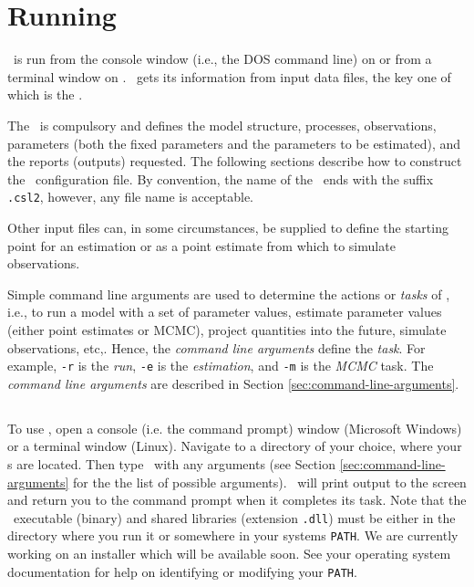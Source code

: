 \section{Running \CNAME\label{sec:running-sam}}

\CNAME\ is run from the console window (i.e., the DOS command line) on  or from a terminal window on . \CNAME\ gets its information from input data files, the key one of which is the \config{}. 

The \config\ is compulsory and defines the model structure, processes, observations, parameters (both the fixed parameters and the parameters to be estimated), and the reports (outputs) requested. The following sections  describe how to construct the \CNAME\ configuration file. By convention, the name of the \config\ ends with the suffix \texttt{.csl2}, however, any file name is acceptable.

Other input files can, in some circumstances, be supplied to define the starting point for an estimation or as a point estimate from which to simulate observations.

Simple command line arguments are used to determine the actions or \emph{tasks} of \CNAME, i.e., to run a model with a set of parameter values, estimate parameter values (either point estimates or MCMC), project quantities into the future, simulate observations, etc,. Hence, the \emph{command line arguments} define the \emph{task}. For example, \texttt{-r} is the \emph{run}, \texttt{-e} is the \emph{estimation}, and \texttt{-m} is the \emph{MCMC} task. The \emph{command line arguments} are described in Section \ref{sec:command-line-arguments}.

\subsection{}
To use \CNAME, open a console (i.e. the command prompt) window (Microsoft Windows) or a terminal window (Linux). Navigate to a directory of your choice, where your \config s are located. Then type \cname\ with any arguments (see Section \ref{sec:command-line-arguments} for the the list of possible arguments). \CNAME\ will print output to the screen and return you to the command prompt when it completes its task. Note that the \CNAME\ executable (binary) and shared libraries (extension \texttt{.dll}) must be either in the directory where you run it or somewhere in your systems \texttt{PATH}. We are currently working on an installer which will be available soon. See your operating system documentation for help on identifying or modifying your \texttt{PATH}.

